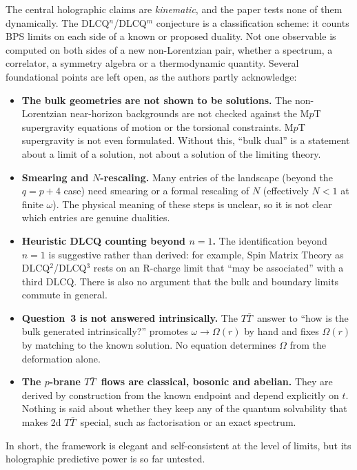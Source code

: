 \documentclass[11pt]{article}
\newcommand{\TT}{$T\bar T$}
\begin{document}
The central holographic claims are \emph{kinematic}, and the paper tests none of them dynamically. The DLCQ$^n$/DLCQ$^m$ conjecture is a classification scheme: it counts BPS limits on each side of a known or proposed duality. Not one observable is computed on both sides of a new non-Lorentzian pair, whether a spectrum, a correlator, a symmetry algebra or a thermodynamic quantity. Several foundational points are left open, as the authors partly acknowledge:
\begin{itemize}
  \item \textbf{The bulk geometries are not shown to be solutions.} The non-Lorentzian near-horizon backgrounds are not checked against the M$p$T supergravity equations of motion or the torsional constraints. M$p$T supergravity is not even formulated. Without this, ``bulk dual'' is a statement about a limit of a solution, not about a solution of the limiting theory.
  \item \textbf{Smearing and $N$-rescaling.} Many entries of the landscape (beyond the $q=p+4$ case) need smearing or a formal rescaling of $N$ (effectively $N<1$ at finite $\omega$). The physical meaning of these steps is unclear, so it is not clear which entries are genuine dualities.
  \item \textbf{Heuristic DLCQ counting beyond $n=1$.} The identification beyond $n=1$ is suggestive rather than derived: for example, Spin Matrix Theory as DLCQ$^2$/DLCQ$^3$ rests on an R-charge limit that ``may be associated'' with a third DLCQ. There is also no argument that the bulk and boundary limits commute in general.
  \item \textbf{Question~3 is not answered intrinsically.} The \TT\ answer to ``how is the bulk generated intrinsically?'' promotes $\omega\to\mathbb\Omega(r)$ by hand and fixes $\mathbb\Omega(r)$ by matching to the known solution. No equation determines $\mathbb\Omega$ from the deformation alone.
  \item \textbf{The $p$-brane \TT\ flows are classical, bosonic and abelian.} They are derived by construction from the known endpoint and depend explicitly on $t$. Nothing is said about whether they keep any of the quantum solvability that makes 2d \TT\ special, such as factorisation or an exact spectrum.
\end{itemize}
In short, the framework is elegant and self-consistent at the level of limits, but its holographic predictive power is so far untested.

\end{document}

